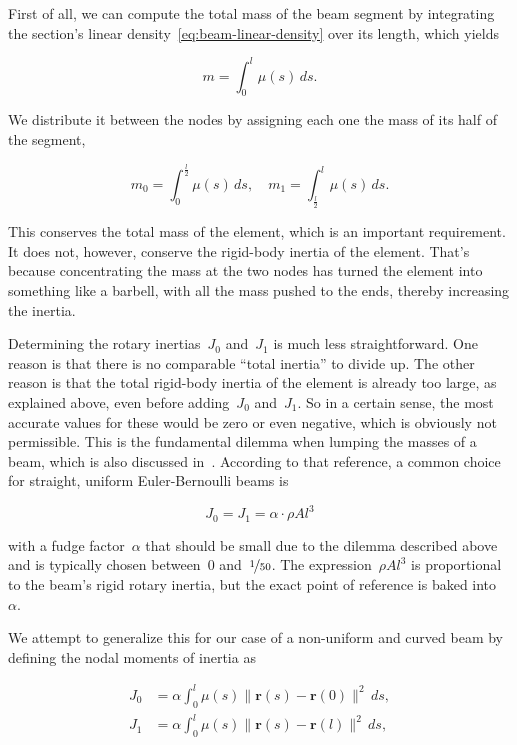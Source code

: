 First of all, we can compute the total mass of the beam segment by integrating the section's linear density~\eqref{eq:beam-linear-density} over its length, which yields

\begin{equation}
m = \int_{0}^{l} \mu(s)\,ds.
\end{equation}

We distribute it between the nodes by assigning each one the mass of its half of the segment,

\begin{equation}
m_0 = \int_{0}^{\frac{l}{2}} \mu(s)\,ds, \quad m_1 = \int_{\frac{l}{2}}^{l} \mu(s)\,ds.
\end{equation}

This conserves the total mass of the element, which is an important requirement.
It does not, however, conserve the rigid-body inertia of the element.
That's because concentrating the mass at the two nodes has turned the element into something like a barbell, with all the mass pushed to the ends, thereby increasing the inertia.

Determining the rotary inertias~$J_0$ and~$J_1$ is much less straightforward.
One reason is that there is no comparable ``total inertia'' to divide up.
The other reason is that the total rigid-body inertia of the element is already too large, as explained above, even before adding~$J_0$ and~$J_1$.
So in a certain sense, the most accurate values for these would be zero or even negative, which is obviously not permissible.
This is the fundamental dilemma when lumping the masses of a beam, which is also discussed in~\cite{bib:colorado31}.
According to that reference, a common choice for straight, uniform Euler-Bernoulli beams is

\begin{equation}
J_{0} = J_{1} = \alpha \cdot \rho A l^3
\end{equation}

with a fudge factor~$\alpha$ that should be small due to the dilemma described above and is typically chosen between~$0$ and~$\nicefrac{1}{50}$.
The expression~$\rho A l^3$ is proportional to the beam's rigid rotary inertia, but the exact point of reference is baked into~$\alpha$.

\newpage
We attempt to generalize this for our case of a non-uniform and curved beam by defining the nodal moments of inertia as

\begin{align}
J_0 &= \alpha \int_{0}^{l} \mu(s) \lVert \boldsymbol{r}(s) - \boldsymbol{r}(0) \rVert^2\,ds, \\
J_1 &= \alpha \int_{0}^{l} \mu(s) \lVert \boldsymbol{r}(s) - \boldsymbol{r}(l) \rVert^2\,ds,
\end{align}

